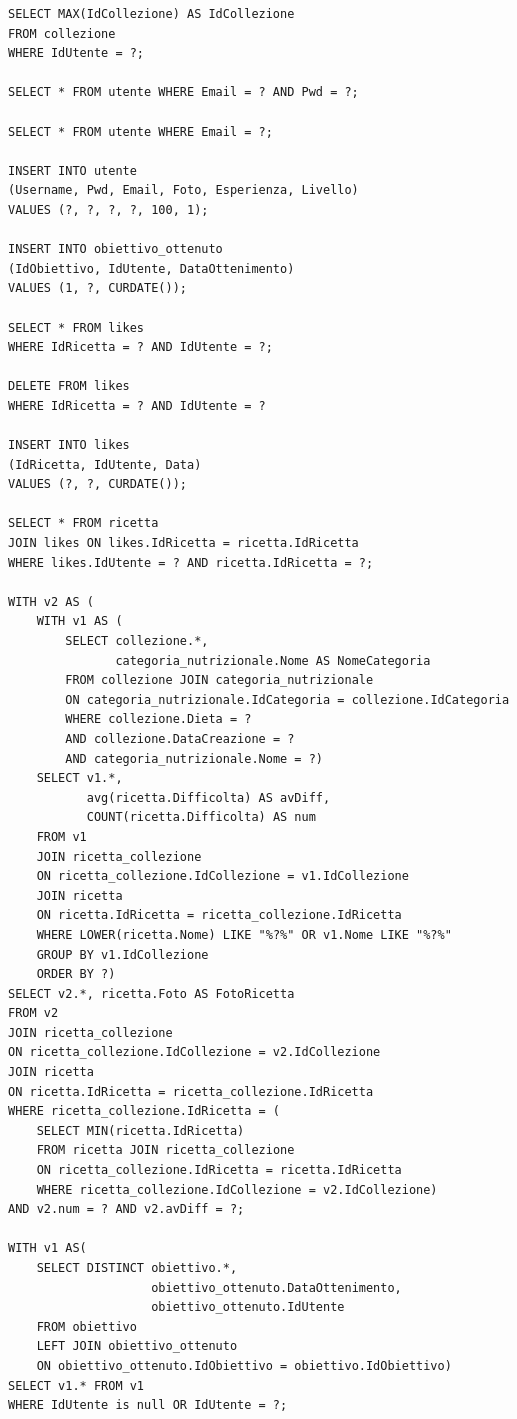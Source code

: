 ﻿\documentclass[a4paper,12pt]{report}
\begin{document}
\begin{verbatim}
SELECT MAX(IdCollezione) AS IdCollezione
FROM collezione
WHERE IdUtente = ?;

SELECT * FROM utente WHERE Email = ? AND Pwd = ?;

SELECT * FROM utente WHERE Email = ?;

INSERT INTO utente
(Username, Pwd, Email, Foto, Esperienza, Livello)
VALUES (?, ?, ?, ?, 100, 1);

INSERT INTO obiettivo_ottenuto
(IdObiettivo, IdUtente, DataOttenimento)
VALUES (1, ?, CURDATE());

SELECT * FROM likes
WHERE IdRicetta = ? AND IdUtente = ?;

DELETE FROM likes
WHERE IdRicetta = ? AND IdUtente = ?

INSERT INTO likes
(IdRicetta, IdUtente, Data)
VALUES (?, ?, CURDATE());

SELECT * FROM ricetta
JOIN likes ON likes.IdRicetta = ricetta.IdRicetta
WHERE likes.IdUtente = ? AND ricetta.IdRicetta = ?;

WITH v2 AS (
    WITH v1 AS (
        SELECT collezione.*,
               categoria_nutrizionale.Nome AS NomeCategoria
        FROM collezione JOIN categoria_nutrizionale
        ON categoria_nutrizionale.IdCategoria = collezione.IdCategoria
        WHERE collezione.Dieta = ?
        AND collezione.DataCreazione = ?
        AND categoria_nutrizionale.Nome = ?)
    SELECT v1.*,
           avg(ricetta.Difficolta) AS avDiff,
           COUNT(ricetta.Difficolta) AS num
    FROM v1
    JOIN ricetta_collezione
    ON ricetta_collezione.IdCollezione = v1.IdCollezione
    JOIN ricetta
    ON ricetta.IdRicetta = ricetta_collezione.IdRicetta
    WHERE LOWER(ricetta.Nome) LIKE "%?%" OR v1.Nome LIKE "%?%"
    GROUP BY v1.IdCollezione
    ORDER BY ?)
SELECT v2.*, ricetta.Foto AS FotoRicetta
FROM v2
JOIN ricetta_collezione
ON ricetta_collezione.IdCollezione = v2.IdCollezione
JOIN ricetta
ON ricetta.IdRicetta = ricetta_collezione.IdRicetta
WHERE ricetta_collezione.IdRicetta = (
    SELECT MIN(ricetta.IdRicetta)
    FROM ricetta JOIN ricetta_collezione
    ON ricetta_collezione.IdRicetta = ricetta.IdRicetta
    WHERE ricetta_collezione.IdCollezione = v2.IdCollezione)
AND v2.num = ? AND v2.avDiff = ?;

WITH v1 AS(
    SELECT DISTINCT obiettivo.*,
                    obiettivo_ottenuto.DataOttenimento,
                    obiettivo_ottenuto.IdUtente
    FROM obiettivo
    LEFT JOIN obiettivo_ottenuto
    ON obiettivo_ottenuto.IdObiettivo = obiettivo.IdObiettivo)
SELECT v1.* FROM v1
WHERE IdUtente is null OR IdUtente = ?;

\end{verbatim}
\end{document}
